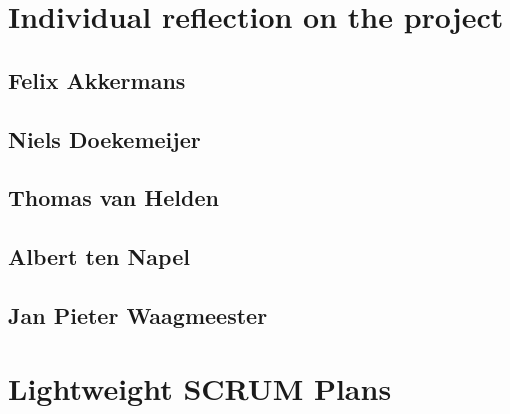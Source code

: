 \documentclass[a4paper]{article}
\begin{document}
\section{Individual reflection on the project} %
\subsection{Felix Akkermans}
\subsection{Niels Doekemeijer}
\subsection{Thomas van Helden}
\subsection{Albert ten Napel}
\subsection{Jan Pieter Waagmeester}

\section{Lightweight SCRUM Plans}
\end{document}
